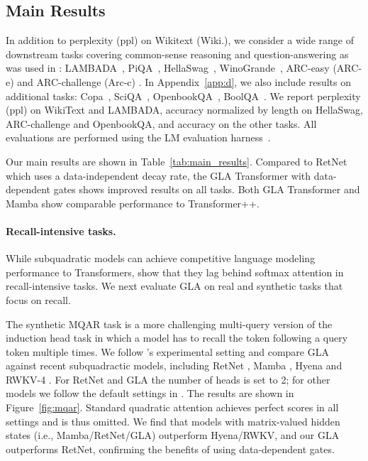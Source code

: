 \subsection{Main Results}

In addition to perplexity (ppl) on Wikitext (Wiki.), we consider a wide range of downstream tasks covering common-sense reasoning and question-answering as was used in \citet{Gu2023MambaLS}: LAMBADA~\citep[LMB.; ][]{paperno2016lambada}, PiQA~\citep{bisk2020piqa}, HellaSwag~\citep[Hella.; ][]{zellers2019hellaswag}, WinoGrande~\citep[Wino.;][]{sakaguchi2021winogrande}, ARC-easy (ARC-e) and ARC-challenge (Arc-c) \citep{arc-ce}. In Appendix~\ref{app:d}, we also include results on additional tasks: Copa~\citep{copa}, SciQA~\citep{SciQA2023}, OpenbookQA~\citep{openbookqa}, BoolQA~\citep{clark2019boolq}. We report perplexity (ppl) on WikiText and LAMBADA, accuracy normalized by length on HellaSwag, ARC-challenge and OpenbookQA, and accuracy on the other tasks. All evaluations are performed using the LM evaluation harness~\citep{eval-harness}.



Our main results are shown in Table~\ref{tab:main_results}. Compared to RetNet which uses a data-independent decay rate, the GLA Transformer with data-dependent gates shows improved results on all tasks. Both GLA Transformer and Mamba show comparable performance to Transformer++. 

\paragraph{Recall-intensive tasks.} While subquadratic models can achieve competitive language modeling performance to Transformers, \citet{Arora2024SimpleLA} show that they  lag behind softmax attention in recall-intensive tasks. We next  evaluate GLA on real and synthetic tasks that focus on recall. 

The synthetic MQAR task \cite{zoology} is a more challenging multi-query version of the induction head task \cite{h3} in which a model has to recall the token following a query token multiple times.   We follow 
\citet{zoology}'s experimental setting and compare GLA against recent subquadractic models, including RetNet \cite{sun2023retentive}, Mamba \cite{Gu2023MambaLS}, Hyena \cite{hyena} and  RWKV-4 \cite{rwkv}. For RetNet and GLA the number of heads is set to 2; for other models we follow the default settings in \citet{zoology}. The results are shown in Figure~\ref{fig:mqar}. Standard quadratic attention achieves perfect scores in all settings and is thus omitted. We find that models with matrix-valued hidden states (i.e., Mamba/RetNet/GLA) outperform Hyena/RWKV, and our GLA outperforms RetNet, confirming the benefits of using data-dependent gates.

